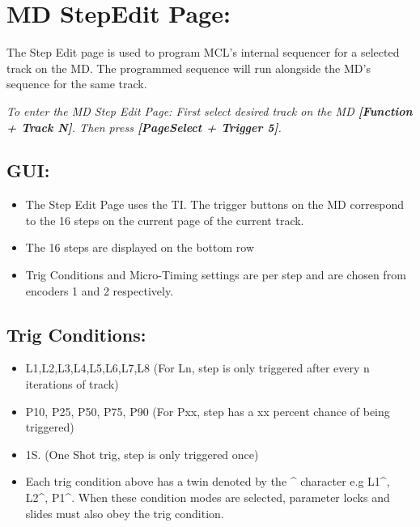 \chapter{MD StepEdit Page:}

The Step Edit page is used to program MCL's internal sequencer for a selected track on the MD. The programmed sequence will run alongside the MD's sequence for the same track.


\textit{To enter the MD Step Edit Page: First select desired track on the MD \textbf{[Function + Track N]}. Then press \textbf{[PageSelect + Trigger 5]}.}



\section{GUI:}
\begin{itemize}
\item The Step Edit Page uses the TI. The trigger buttons on the MD correspond to the 16 steps on the current page of the current track.
\item The 16 steps are displayed on the bottom row
\item Trig Conditions and Micro-Timing settings are per step and are chosen from encoders 1 and 2 respectively.
\end{itemize}

\section{Trig Conditions:}
\begin{itemize}
\item L1,L2,L3,L4,L5,L6,L7,L8 (For Ln, step is only triggered after every n iterations of track)
\item P10, P25, P50, P75, P90 (For Pxx, step has a xx percent chance of being triggered)
\item 1S. (One Shot trig, step is only triggered once)
\item Each trig condition above has a twin denoted by the \^{} character e.g L1\^{}, L2\^{}, P1\^{}. When these condition modes are selected, parameter locks and slides must also obey the trig condition.
\end{itemize}
